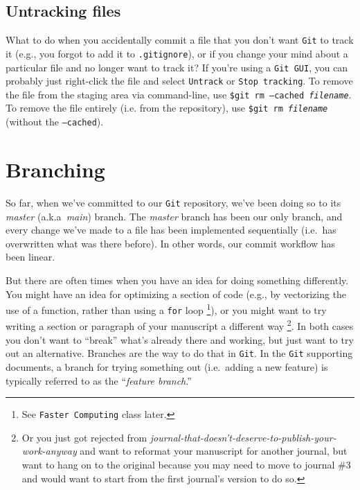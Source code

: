 \documentclass[12pt,letterpaper]{article}
\begin{document}
\subsection{Untracking files}
What to do when you accidentally commit a file that you don't want \texttt{Git} to 
track it (e.g., you forgot to add it to \texttt{.gitignore}), 
or if you change your mind about a particular file and no longer want to track it?
If you're using a \texttt{Git GUI}, you can probably just right-click the file and select \texttt{Untrack} or \texttt{Stop tracking}.
To remove the file from the staging area via command-line, 
use \texttt{\$git rm --cached \emph{filename}}.  
To remove the file entirely (i.e. from the repository), 
use \texttt{\$git rm \emph{filename}} (without the \texttt{--cached}).


\section{Branching}
So far, when we've committed to our \texttt{Git} repository, 
we've been doing so to its \emph{master} (a.k.a~\emph{main}) branch.
The \emph{master} branch has been our only branch, 
and every change we've made to a file has been implemented sequentially
(i.e.~has overwritten what was there before).
In other words, our commit workflow has been linear.

But there are often times when you have an idea for doing something differently.
You might have an idea for optimizing a section of code
(e.g., by vectorizing the use of a function, rather than using a \texttt{for} loop
\unskip
\footnote{See \texttt{Faster Computing} class later.}), 
or you might want to try writing a section or paragraph of your manuscript a 
different way
\unskip
\footnote{Or you just got rejected from 
	\emph{journal-that-doesn't-deserve-to-publish-your-work-anyway} and want 
	to reformat your manuscript for another journal, but want to hang on to the 
	original because you may need to move to journal \#3 and would want to 
	start from the first journal's version to do so.}.
In both cases you don't want to ``break'' what's already there and working, 
but just want to try out an alternative.
Branches are the way to do that in \texttt{Git}.
In the \texttt{Git} supporting documents, 
a branch for trying something out (i.e.~adding a new feature) 
is typically referred to as the ``\emph{feature branch}.''
\end{document}
